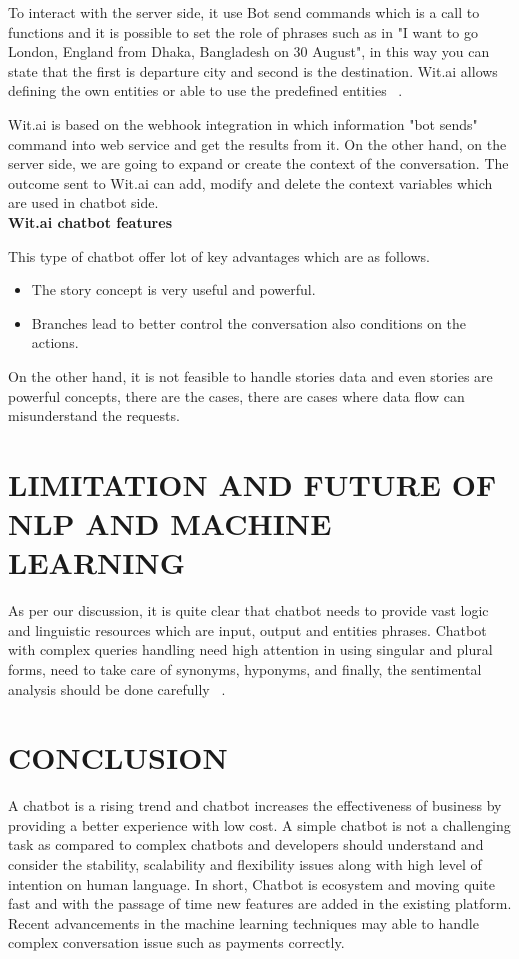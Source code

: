 \documentclass[conference]{IEEEtran}
\begin{document}
To interact with the server side, it use Bot send commands which is a call to functions and it is possible to set the role of phrases such as in "I want to go London, England from Dhaka, Bangladesh on 30 August", in this way you can state that the first is departure city and second is the destination. Wit.ai allows defining the own entities or able to use the predefined entities ~\cite{b10}.

Wit.ai is based on the webhook integration in which information "bot sends" command into web service and get the results from it. On the other hand, on the server side, we are going to expand or create the context of the conversation. The outcome sent to Wit.ai can add, modify and delete the context variables which are used in chatbot side.\\

\textbf{Wit.ai chatbot features}

This type of chatbot offer lot of key advantages which are as follows.
\begin{itemize}
\item The story concept is very useful and powerful.
\item Branches lead to better control the conversation also conditions on the actions.\\
\end{itemize}
On the other hand, it is not feasible to handle stories data and even stories are powerful concepts, there are the cases, there are cases where data flow can misunderstand the requests.

\section{LIMITATION AND FUTURE OF NLP AND MACHINE LEARNING}
As per our discussion, it is quite clear that chatbot needs to provide vast logic and linguistic resources which are input, output and entities phrases. Chatbot with complex queries handling need high attention in using singular and plural forms, need to take care of synonyms, hyponyms, and finally, the sentimental analysis should be done carefully ~\cite{b11}.

\section{CONCLUSION}
A chatbot is a rising trend and chatbot increases the effectiveness of business by providing a better experience with low cost. A simple chatbot is not a challenging task as compared to complex chatbots and developers should understand and consider the stability, scalability and flexibility issues along with high level of intention on human language. In short, Chatbot is ecosystem and moving quite fast and with the passage of time new features are added in the existing platform. Recent advancements in the machine learning techniques may able to handle complex conversation issue such as payments correctly.
\end{document}
